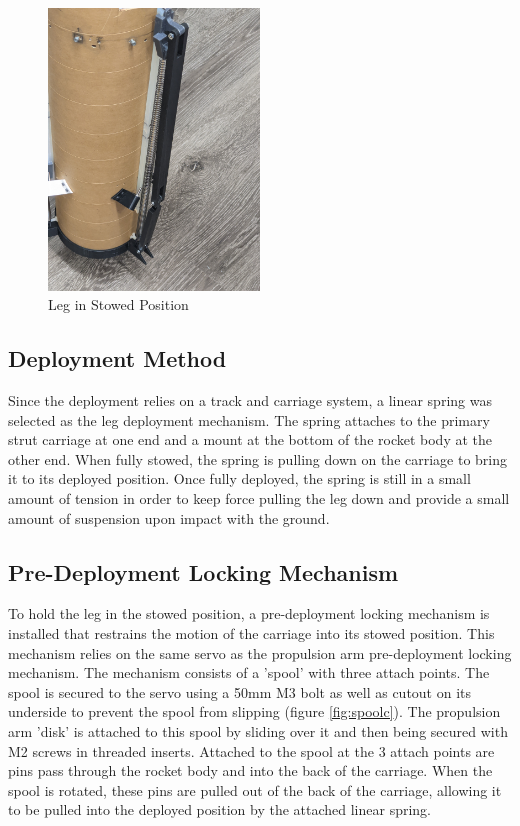 \begin{figure}[H]
    \centering
    \includegraphics[width=0.5\textwidth]{src/figs/Stowed_Leg.jpg}
    \caption{Leg in Stowed Position}
    \label{fig:LegStowed}
\end{figure}

\subsection{Deployment Method}
Since the deployment relies on a track and carriage system, a linear spring was selected as the leg deployment mechanism. The spring attaches to the primary strut carriage at one end and a mount at the bottom of the rocket body at the other end. When fully stowed, the spring is pulling down on the carriage to bring it to its deployed position. Once fully deployed, the spring is still in a small amount of tension in order to keep force pulling the leg down and provide a small amount of suspension upon impact with the ground.

\subsection{Pre-Deployment Locking Mechanism}
To hold the leg in the stowed position, a pre-deployment locking mechanism is installed that restrains the motion of the carriage into its stowed position. This mechanism relies on the same servo as the propulsion arm pre-deployment locking mechanism. The mechanism consists of a 'spool' with three attach points. The spool is secured to the servo using a 50mm M3 bolt as well as cutout on its underside to prevent the spool from slipping (figure \ref{fig:spoolc}). The propulsion arm 'disk' is attached to this spool by sliding over it and then being secured with M2 screws in threaded inserts. Attached to the spool at the 3 attach points are pins pass through the rocket body and into the back of the carriage. When the spool is rotated, these pins are pulled out of the back of the carriage, allowing it to be pulled into the deployed position by the attached linear spring. 

